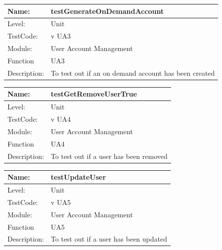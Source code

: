 \documentclass[12pt]{article}
\begin{document}
\begin{flushleft}
\begin{center}
\begin{tabular}{|l|p{12cm}|}
\end{tabular}
\end{center}

\begin{center}
\begin{tabular}{|l|p{12cm}|}
\hline

 Name: & testGenerateOnDemandAccount \\
\hline
Level: & Unit \\
\hline
TestCode: & v UA3 \\
\hline
Module:& User Account Management\\
\hline
Function & UA3 \\
\hline
Description: & To test out if an on demand account has been created \\
\hline

\end{tabular}
\end{center}

\begin{center}
\begin{tabular}{|l|p{12cm}|}
\hline

 Name: & testGetRemoveUserTrue \\
\hline
Level: & Unit \\
\hline
TestCode: & v UA4 \\
\hline
Module:& User Account Management\\
\hline
Function & UA4 \\
\hline
Description: & To test out if a user has been removed \\
\hline

\end{tabular}
\end{center}

\begin{center}
\begin{tabular}{|l|p{12cm}|}
\hline

 Name: & testUpdateUser \\
\hline
Level: & Unit \\
\hline
TestCode: & v UA5 \\
\hline
Module:& User Account Management\\
\hline
Function & UA5 \\
\hline
Description: & To test out if a user has been updated \\
\hline


\end{tabular}
\end{center}
\end{flushleft}
\end{document}
